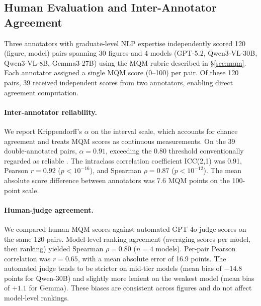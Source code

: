 \subsection{Human Evaluation and Inter-Annotator Agreement}
\label{sec:appendix-human-validation}

Three annotators with graduate-level NLP expertise independently scored 120 (figure, model) pairs spanning 30 figures and 4 models (GPT-5.2, Qwen3-VL-30B, Qwen3-VL-8B, Gemma3-27B) using the MQM rubric described in \S\ref{sec:mqm}. Each annotator assigned a single MQM score (0--100) per pair. Of these 120 pairs, 39 received independent scores from two annotators, enabling direct agreement computation.

\paragraph{Inter-annotator reliability.}
We report Krippendorff's $\alpha$ on the interval scale, which accounts for chance agreement and treats MQM scores as continuous measurements. On the 39 double-annotated pairs, $\alpha = 0.91$, exceeding the 0.80 threshold conventionally regarded as reliable \citep{krippendorff2011computing}. The intraclass correlation coefficient ICC(2,1) was 0.91, Pearson $r = 0.92$ ($p < 10^{-16}$), and Spearman $\rho = 0.87$ ($p < 10^{-12}$). The mean absolute score difference between annotators was 7.6 MQM points on the 100-point scale.

\paragraph{Human-judge agreement.}
We compared human MQM scores against automated GPT-4o judge scores on the same 120 pairs. Model-level ranking agreement (averaging scores per model, then ranking) yielded Spearman $\rho = 0.80$ ($n = 4$ models). Per-pair Pearson correlation was $r = 0.65$, with a mean absolute error of 16.9 points. The automated judge tends to be stricter on mid-tier models (mean bias of $-14.8$ points for Qwen-30B) and slightly more lenient on the weakest model (mean bias of $+1.1$ for Gemma). These biases are consistent across figures and do not affect model-level rankings.

